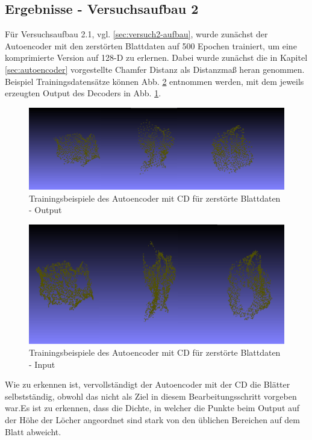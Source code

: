 \documentclass{llncs}
\begin{document}
\subsection{Ergebnisse - Versuchsaufbau 2}
Für Versuchsaufbau 2.1, vgl. \ref{sec:versuch2-aufbau}, wurde zunächst der Autoencoder mit den zerstörten Blattdaten auf 500 Epochen trainiert, um eine komprimierte Version auf 128-D zu erlernen. Dabei wurde zunächst die in Kapitel \ref{sec:autoencoder} vorgestellte Chamfer Distanz als Distanzmaß heran genommen. Beispiel Trainingsdatensätze können Abb. \ref{fig:Bild1003} entnommen werden, mit dem jeweils erzeugten Output des Decoders in Abb. \ref{fig:Bild68}. 
\begin{figure}[htbp] 
	\centering
	\includegraphics[width=1.0\textwidth]{autoencoder_destroyed_example_chamfer_fake.png}
	\caption{Trainingsbeispiele des Autoencoder mit CD für zerstörte Blattdaten - Output}
	\label{fig:Bild68}
\end{figure}
\begin{figure}[htbp] 
	\centering
	\includegraphics[width=1.0\textwidth]{autoencoder_destroyed_example_chamfer_real.png}
	\caption{Trainingsbeispiele des Autoencoder mit CD für zerstörte Blattdaten - Input}
	\label{fig:Bild1003}
\end{figure}
Wie zu erkennen ist, vervollständigt der Autoencoder mit der CD die Blätter selbstständig, obwohl das nicht als Ziel in diesem Bearbeitungsschritt vorgeben war.Es ist zu erkennen, dass die Dichte, in welcher die Punkte beim Output auf der Höhe der Löcher angeordnet sind stark von den üblichen Bereichen auf dem Blatt abweicht. 
\end{document}
